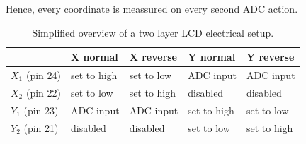 Hence, every coordinate is meassured on every second ADC action.

\begin{table}\caption{Simplified overview of a two layer LCD electrical setup.}\begin{tabular}{|l|l|l|l|l|}\hline & X normal & X reverse & Y normal & Y reverse \\ \hline $X_{1}$ (pin 24) & set to high & set to low & ADC input & ADC input \\ \hline $X_{2}$ (pin 22) & set to low & set to high & disabled & disabled\\ \hline $Y_{1}$ (pin 23) & ADC input & ADC input & set to high & set to low \\ \hline $Y_{2}$ (pin 21) & disabled & disabled & set to low & set to high \\ \hline\end{tabular}\label{table:LCD_screen_measurement} \end{table} 
